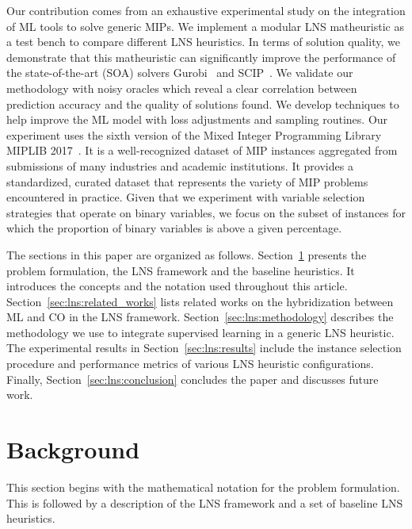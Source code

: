 \documentclass[3p, authoryear, times]{elsarticle}
\begin{document}
Our contribution comes from an exhaustive experimental study on the integration of ML tools to solve generic MIPs. We implement a modular LNS matheuristic as a test bench to compare different LNS heuristics. In terms of solution quality, we demonstrate that this matheuristic can significantly improve the performance of the state-of-the-art (SOA) solvers Gurobi~\citep{gurobi} and SCIP~\citep{bestuzheva_scip_2021}. We validate our methodology with noisy oracles which reveal a clear correlation between prediction accuracy and the quality of solutions found. We develop techniques to help improve the ML model with loss adjustments and sampling routines. Our experiment uses the sixth version of the Mixed Integer Programming Library MIPLIB 2017~\citep{gleixner_miplib_2021}. It is a well-recognized dataset of MIP instances aggregated from submissions of many industries and academic institutions. It provides a standardized, curated dataset that represents the variety of MIP problems encountered in practice. Given that we experiment with variable selection strategies that operate on binary variables, we focus on the subset of instances for which the proportion of binary variables is above a given percentage.  


The sections in this paper are organized as follows. Section~\ref{sec:lns:background} presents the problem formulation, the LNS framework and the baseline heuristics. It introduces the concepts and the notation used throughout this article. Section~\ref{sec:lns:related_works} lists related works on the hybridization between ML and CO in the LNS framework. Section~\ref{sec:lns:methodology} describes the methodology we use to integrate supervised learning in a generic LNS heuristic. The experimental results in Section~\ref{sec:lns:results} include the instance selection procedure and performance metrics of various LNS heuristic configurations. Finally, Section~\ref{sec:lns:conclusion} concludes the paper and discusses future work.

\section{Background}  \label{sec:lns:background}
This section begins with the mathematical notation for the problem formulation. This is followed by a description of the LNS framework and a set of baseline LNS heuristics.  
\end{document}

